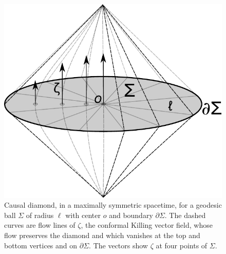 \documentclass[aps,prd,twocolumn,showpacs,groupedaddress,nofootinbib,longbibliography]{revtex4-1}
\def\z{\zeta}
\begin{document}
%
\begin{figure}
\centering
\includegraphics[scale=0.6]{doublecone3.pdf}
\caption{Causal diamond, in a maximally symmetric spacetime, for a geodesic ball $\Sigma$ of radius $\ell$ with center $o$ and boundary $\partial \Sigma$. 
The dashed curves are flow lines of $\z$, the conformal Killing vector field, whose flow preserves the diamond
and  which vanishes at the top and bottom vertices and on $\partial\Sigma$.
The vectors show $\z$ at four points of $\Sigma$.}
\label{doublecone}
\end{figure}
%
\end{document}
